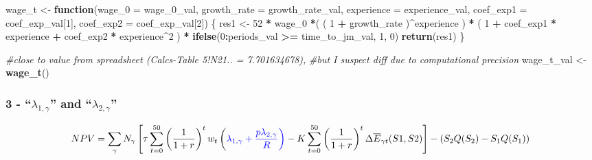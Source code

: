 \documentclass[]{article}
\newenvironment{Shaded}{\begin{snugshade}}{\end{snugshade}}
\newcommand{\CommentTok}[1]{\textcolor[rgb]{0.56,0.35,0.01}{\textit{#1}}}
\newcommand{\ControlFlowTok}[1]{\textcolor[rgb]{0.13,0.29,0.53}{\textbf{#1}}}
\newcommand{\DataTypeTok}[1]{\textcolor[rgb]{0.13,0.29,0.53}{#1}}
\newcommand{\DecValTok}[1]{\textcolor[rgb]{0.00,0.00,0.81}{#1}}
\newcommand{\KeywordTok}[1]{\textcolor[rgb]{0.13,0.29,0.53}{\textbf{#1}}}
\newcommand{\NormalTok}[1]{#1}
\newcommand{\OperatorTok}[1]{\textcolor[rgb]{0.81,0.36,0.00}{\textbf{#1}}}
\newcommand{\StringTok}[1]{\textcolor[rgb]{0.31,0.60,0.02}{#1}}
\begin{document}
\begin{Shaded}
\begin{Highlighting}[]
\NormalTok{wage_t <-}\StringTok{ }\ControlFlowTok{function}\NormalTok{(}\DataTypeTok{wage_0 =}\NormalTok{ wage_}\DecValTok{0}\NormalTok{_val, }
                   \DataTypeTok{growth_rate =}\NormalTok{ growth_rate_val, }
                   \DataTypeTok{experience =}\NormalTok{ experience_val, }
                   \DataTypeTok{coef_exp1 =}\NormalTok{ coef_exp_val[}\DecValTok{1}\NormalTok{], }
                   \DataTypeTok{coef_exp2 =}\NormalTok{ coef_exp_val[}\DecValTok{2}\NormalTok{]) \{}
\NormalTok{  res1 <-}\StringTok{ }\DecValTok{52} \OperatorTok{*}\StringTok{ }\NormalTok{wage_}\DecValTok{0} \OperatorTok{*}\NormalTok{( ( }\DecValTok{1} \OperatorTok{+}\StringTok{ }\NormalTok{growth_rate )}\OperatorTok{^}\NormalTok{experience ) }\OperatorTok{*}\StringTok{ }
\StringTok{    }\NormalTok{( }\DecValTok{1} \OperatorTok{+}\StringTok{ }\NormalTok{coef_exp1 }\OperatorTok{*}\StringTok{ }\NormalTok{experience }\OperatorTok{+}\StringTok{ }\NormalTok{coef_exp2 }\OperatorTok{*}\StringTok{ }\NormalTok{experience}\OperatorTok{^}\DecValTok{2}\NormalTok{ ) }\OperatorTok{*}\StringTok{ }
\StringTok{    }\KeywordTok{ifelse}\NormalTok{(}\DecValTok{0}\OperatorTok{:}\NormalTok{periods_val }\OperatorTok{>=}\StringTok{ }\NormalTok{time_to_jm_val, }\DecValTok{1}\NormalTok{, }\DecValTok{0}\NormalTok{)}
  \KeywordTok{return}\NormalTok{(res1) }
\NormalTok{\}}

\CommentTok{#close to value from spreadsheet (Calcs-Table 5!N21.. = 7.701634678), }
\CommentTok{#but I suspect diff due to computational precision }
\NormalTok{wage_t_val <-}\StringTok{ }\KeywordTok{wage_t}\NormalTok{()}
\end{Highlighting}
\end{Shaded}

\hypertarget{lambda_1gamma-and-lambda_2gamma}{%
\subsubsection{\texorpdfstring{3 - ``\(\lambda_{1,\gamma}\)'' and
``\(\lambda_{2,\gamma}\)''}{3 - ``\textbackslash{}lambda\_\{1,\textbackslash{}gamma\}'' and ``\textbackslash{}lambda\_\{2,\textbackslash{}gamma\}''}}\label{lambda_1gamma-and-lambda_2gamma}}

\begin{equation}
NPV =  \sum_{\gamma} N_{\gamma} \left[ 
\tau \sum_{t=0}^{50}\left(  \frac{1}{1 + r}\right)^{t} w_{t} 
\left(\color{blue}{ \lambda_{1, \gamma} } + \frac{p \color{blue}{\lambda_{2, \gamma}}}{R} \right) - 
K \sum_{t=0}^{50} \left( \frac{1}{1 + r}\right)^{t} \Delta \overline{E}_{\gamma t}(S1,S2)
\right] - \left( S_{2}Q(S_{2}) - S_{1}Q(S_{1}) \right)
\end{equation}
\end{document}
